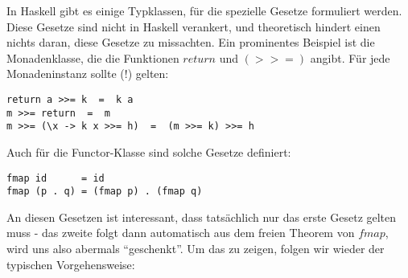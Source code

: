 \documentclass[11pt]{article} %
\begin{document}
In Haskell gibt es einige Typklassen, für die spezielle Gesetze formuliert werden. Diese Gesetze sind nicht in Haskell
verankert, und theoretisch hindert einen nichts daran, diese Gesetze zu missachten. Ein prominentes Beispiel ist die
Monadenklasse, die die Funktionen $return$ und $(>>=)$ angibt. Für jede Monadeninstanz sollte (!) gelten:

\begin{lstlisting}
return a >>= k  =  k a
m >>= return  =  m
m >>= (\x -> k x >>= h)  =  (m >>= k) >>= h
\end{lstlisting}

Auch für die Functor-Klasse sind solche Gesetze definiert:

\begin{lstlisting}
fmap id      = id
fmap (p . q) = (fmap p) . (fmap q)
\end{lstlisting}

An diesen Gesetzen ist interessant, dass tatsächlich nur das erste Gesetz gelten muss - das zweite folgt dann automatisch
aus dem freien Theorem von $fmap$, wird uns also abermals ``geschenkt''. Um das zu zeigen, folgen wir wieder der typischen Vorgehensweise:

\begin{align*}
\end{align*}


\newpage

\end{document}
